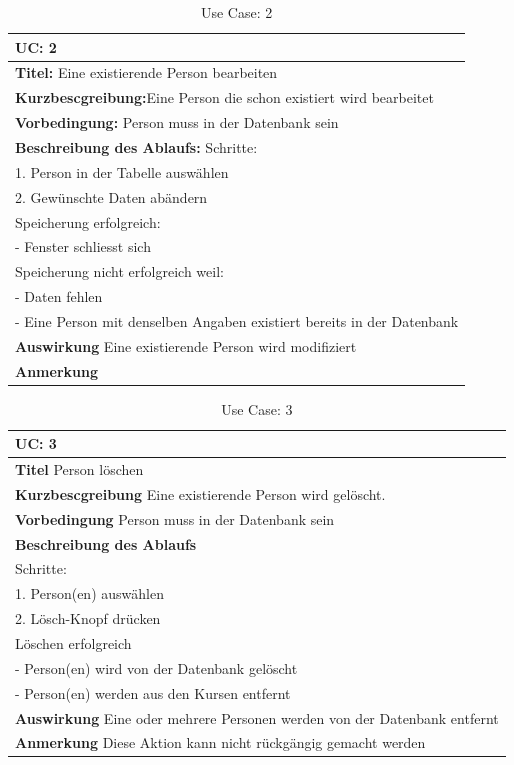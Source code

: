 %
\begin{table}[h]
\caption{Use Case: 2}
\begin{tabular}[ht]{|p{15cm}|}
  \hline
  \textbf{UC:} 2\\
  \hline
  \textbf{Titel:} Eine existierende Person bearbeiten\\
  \hline
  \textbf{Kurzbescgreibung:}Eine Person die schon existiert wird bearbeitet\\
  \hline
  \textbf{Vorbedingung:} Person muss in der Datenbank sein\\
  \hline
  \textbf{Beschreibung des Ablaufs:} Schritte:\\
1. Person in der Tabelle auswählen\\
2. Gewünschte Daten abändern\\
Speicherung erfolgreich:\\
- Fenster schliesst sich\\
Speicherung nicht erfolgreich weil:\\
- Daten fehlen\\
- Eine Person mit denselben Angaben existiert bereits in der Datenbank\\
  \hline
  \textbf{Auswirkung} Eine existierende Person wird modifiziert\\
  \hline
  \textbf{Anmerkung}\\
  \hline
\end{tabular}
\end{table}
%
\begin{table}[h]
\caption{Use Case: 3}
\begin{tabular}[ht]{|p{15cm}|}
  \hline
  \textbf{UC:} 3\\
  \hline
  \textbf{Titel} Person löschen\\
  \hline
  \textbf{Kurzbescgreibung} Eine existierende Person wird gelöscht.\\
  \hline
  \textbf{Vorbedingung} Person muss in der Datenbank sein\\
  \hline
  \textbf{Beschreibung des Ablaufs}\\
Schritte:\\
1. Person(en) auswählen\\
2. Lösch-Knopf drücken\\
Löschen erfolgreich\\
- Person(en) wird von der Datenbank gelöscht\\
- Person(en) werden aus den Kursen entfernt\\
  \hline
  \textbf{Auswirkung} Eine oder mehrere Personen werden von der Datenbank entfernt\\
  \hline
  \textbf{Anmerkung} Diese Aktion kann nicht rückgängig gemacht werden\\
  \hline
\end{tabular}
\end{table}
